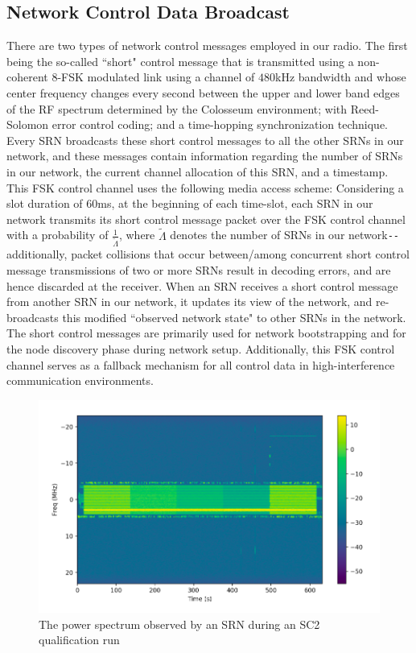 \subsection{Network Control Data Broadcast}\label{B.I.II}
There are two types of network control messages employed in our radio. The first being the so-called ``short" control message that is transmitted using a non-coherent $8$-FSK modulated link using a channel of $480$kHz bandwidth and whose center frequency changes every second between the upper and lower band edges of the RF spectrum determined by the Colosseum environment; with Reed-Solomon error control coding; and a time-hopping synchronization technique. Every SRN broadcasts these short control messages to all the other SRNs in our network, and these messages contain information regarding the number of SRNs in our network, the current channel allocation of this SRN, and a timestamp. This FSK control channel uses the following media access scheme: Considering a slot duration of $60$ms, at the beginning of each time-slot, each SRN in our network transmits its short control message packet over the FSK control channel with a probability of $\frac{1}{\tilde{\Lambda}}$, where $\tilde{\Lambda}$ denotes the number of SRNs in our network\texttt{-{}-}additionally, packet collisions that occur between/among concurrent short control message transmissions of two or more SRNs result in decoding errors, and are hence discarded at the receiver. When an SRN receives a short control message from another SRN in our network, it updates its view of the network, and re-broadcasts this modified ``observed network state" to other SRNs in the network. The short control messages are primarily used for network bootstrapping and for the node discovery phase during network setup. Additionally, this FSK control channel serves as a fallback mechanism for all control data in high-interference communication environments. 
\begin{figure} [htb]
    \centerline{
    \includegraphics[width = 1.0\textwidth]{Control_Channels_At_Band_Edges.PNG}}
    \caption{The power spectrum observed by an SRN during an SC2 qualification run}
    \label{fig:B.1}
\end{figure}

